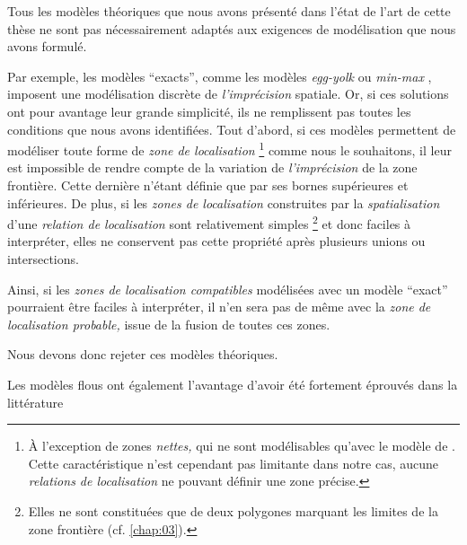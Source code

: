 Tous les modèles théoriques que nous avons présenté dans l'état de
l'art de cette thèse ne sont pas nécessairement adaptés aux exigences
de modélisation que nous avons formulé.


Par exemple, les modèles \enquote{exacts}, comme les modèles
\emph{egg-yolk} \autocite{Cohn1996} ou \emph{min-max}
\autocite{Clementini1996}, imposent une modélisation discrète de
\emph{l'imprécision} spatiale. Or, si ces solutions ont pour avantage
leur grande simplicité, ils ne remplissent pas toutes les conditions
que nous avons identifiées. Tout d'abord, si ces modèles permettent de
modéliser toute forme de \emph{zone de localisation} \footnote{À
  l'exception de zones \emph{nettes,} qui ne sont modélisables qu'avec
  le modèle de \textcite{Bejaoui2009}. Cette caractéristique n'est
  cependant pas limitante dans notre cas, aucune \emph{relations de
    localisation} ne pouvant définir une zone précise.} comme nous le
souhaitons, il leur est impossible de rendre compte de la variation de
\emph{l'imprécision} de la zone frontière. Cette dernière n'étant
définie que par ses bornes supérieures et inférieures. De plus, si les
\emph{zones de localisation} construites par la \emph{spatialisation}
d'une \emph{relation de localisation} sont relativement simples
\footnote{Elles ne sont constituées que de deux polygones marquant les
  limites de la zone frontière (cf. \autoref{chap:03}).} et donc
faciles à interpréter, elles ne conservent pas cette propriété après
plusieurs unions ou intersections.

Ainsi, si les \emph{zones de localisation compatibles} modélisées avec
un modèle \enquote{exact} pourraient être faciles à interpréter, il
n'en sera pas de même avec la \emph{zone de localisation probable,}
issue de la fusion de toutes ces zones.


Nous devons donc rejeter ces modèles théoriques.




Les modèles flous ont également l'avantage d'avoir été fortement
éprouvés dans la littérature


